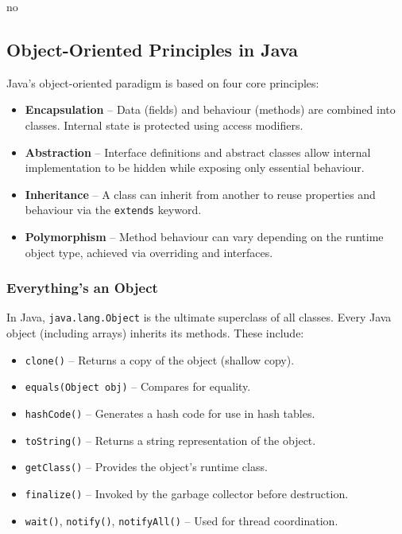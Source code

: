 no\documentclass{article}
\newcommand{\codecmd}[1]{\textcolor[rgb]{0,0.5,0}{\texttt{#1}}}
\begin{document}
\subsection{Object-Oriented Principles in Java}

Java’s object-oriented paradigm is based on four core principles:

\begin{itemize}
    \item \textbf{Encapsulation} – Data (fields) and behaviour (methods) are combined into classes. Internal state is protected using access modifiers.
    \item \textbf{Abstraction} – Interface definitions and abstract classes allow internal implementation to be hidden while exposing only essential behaviour.
    \item \textbf{Inheritance} – A class can inherit from another to reuse properties and behaviour via the \texttt{extends} keyword.
    \item \textbf{Polymorphism} – Method behaviour can vary depending on the runtime object type, achieved via overriding and interfaces.
\end{itemize}

\subsubsection{Everything's an Object}

In Java, \codecmd{java.lang.Object} is the ultimate superclass of all classes. Every Java object (including arrays) inherits its methods. These include:

\begin{itemize}
    \item \codecmd{clone()} – Returns a copy of the object (shallow copy).
    \item \codecmd{equals(Object obj)} – Compares for equality.
    \item \codecmd{hashCode()} – Generates a hash code for use in hash tables.
    \item \codecmd{toString()} – Returns a string representation of the object.
    \item \codecmd{getClass()} – Provides the object's runtime class.
    \item \codecmd{finalize()} – Invoked by the garbage collector before destruction.
    \item \codecmd{wait()}, \codecmd{notify()}, \codecmd{notifyAll()} – Used for thread coordination.
\end{itemize}
\end{document}
